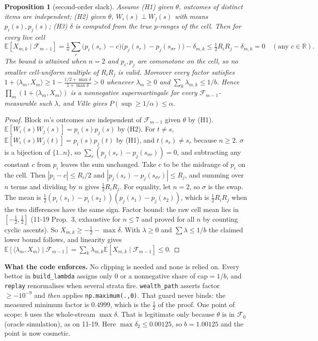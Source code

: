 \documentclass[11pt]{article}
\newtheorem{proposition}{Proposition}
\newcommand{\E}{\mathbb{E}}
\newcommand{\Fc}{\mathcal{F}}
\begin{document}
\begin{proposition}[second-order slack]\label{prop:d2}
Assume (H1) given $\theta$, outcomes of distinct items are independent; (H2) given $\theta$, $W_i(s)\perp W_j(s)$ with means $p_i(s),p_j(s)$; (H3) $\delta$ is computed from the true $p$-ranges of the cell. Then for every live cell
\[
\E[X_{m,k}\mid\Fc_{m-1}]=\tfrac1n\textstyle\sum_r\big(p_i(s_r)-c\big)\big(p_j(s_r)-p_j(s_{\sigma r})\big)-\delta_{m,k}\le\tfrac12R_iR_j-\delta_{m,k}=0\quad(\text{any }c\in\mathbb R).
\]
The bound is attained when $n=2$ and $p_i,p_j$ are comonotone on the cell, so no smaller cell-uniform multiple of $R_iR_j$ is valid.
Moreover every factor satisfies $1+\langle\lambda_m,X_m\rangle\ge1-\frac{1/2+\max\delta}{1+\max\delta}>0$ whenever $\lambda_m\ge0$ and $\sum_k\lambda_{m,k}\le1/b$. Hence $\prod_m(1+\langle\lambda_m,X_m\rangle)$ is a nonnegative supermartingale for every $\Fc_{m-1}$-measurable such $\lambda$, and Ville gives $P(\sup\ge1/\alpha)\le\alpha$.
\end{proposition}
\begin{proof}
Block $m$'s outcomes are independent of $\Fc_{m-1}$ given $\theta$ by (H1).
$\E[W_i(s)W_j(s)]=p_i(s)p_j(s)$ by (H2). For $t\ne s$, $\E[W_i(s)W_j(t)]=p_i(s)p_j(t)$ by (H1), and $t(s_r)\ne s_r$ because $n\ge2$.
$\sigma$ is a bijection of $\{1..n\}$, so $\sum_r(p_j(s_r)-p_j(s_{\sigma r}))=0$, and subtracting any constant $c$ from $p_i$ leaves the sum unchanged.
Take $c$ to be the midrange of $p_i$ on the cell. Then $|p_i-c|\le R_i/2$ and $|p_j(s_r)-p_j(s_{\sigma r})|\le R_j$, and summing over $n$ terms and dividing by $n$ gives $\tfrac12R_iR_j$.
For equality, let $n=2$, so $\sigma$ is the swap. The mean is $\tfrac12(p_i(s_1)-p_i(s_2))(p_j(s_1)-p_j(s_2))$, which is $\tfrac12R_iR_j$ when the two differences have the same sign.
Factor bound: the raw cell mean lies in $[-\tfrac12,\tfrac12]$ (11-19 Prop.~3, exhaustive for $n\le7$ and proved for all $n$ by counting cyclic ascents). So $X_{m,k}\ge-\tfrac12-\max\delta$. With $\lambda\ge0$ and $\sum\lambda\le1/b$ the claimed lower bound follows, and linearity gives $\E[\langle\lambda_m,X_m\rangle\mid\Fc_{m-1}]=\sum_k\lambda_{m,k}\E[X_{m,k}\mid\Fc_{m-1}]\le0$.
\end{proof}
\textbf{What the code enforces.} No clipping is needed and none is relied on. Every bettor in \texttt{build\_lambda} assigns only $0$ or a nonnegative share of cap$=1/b$, and \texttt{replay} renormalises when several strata fire.
\texttt{wealth\_path} asserts factor $\ge-10^{-9}$ and \emph{then} applies \texttt{np.maximum(.,0)}. That guard never binds: the measured minimum factor is $0.4999$, which is the $\tfrac12$ of the proof.
One point of scope: $b$ uses the whole-stream $\max\delta$. That is legitimate only because $\theta$ is in $\Fc_0$ (oracle simulation), as on 11-19. Here $\max\delta_2\le0.00125$, so $b=1.00125$ and the point is now cosmetic.
\end{document}
